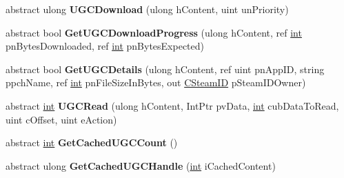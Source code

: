 \begin{DoxyCompactItemize}
\item 
\hypertarget{classValve_1_1Steamworks_1_1ISteamRemoteStorage_af43ba8d7eaeb954b49d538346be65f94}{}abstract ulong {\bfseries U\+G\+C\+Download} (ulong h\+Content, uint un\+Priority)\label{classValve_1_1Steamworks_1_1ISteamRemoteStorage_af43ba8d7eaeb954b49d538346be65f94}

\item 
\hypertarget{classValve_1_1Steamworks_1_1ISteamRemoteStorage_a98a4c419b5824559b90376d40bc0c92f}{}abstract bool {\bfseries Get\+U\+G\+C\+Download\+Progress} (ulong h\+Content, ref \hyperlink{SDL__thread_8h_a6a64f9be4433e4de6e2f2f548cf3c08e}{int} pn\+Bytes\+Downloaded, ref \hyperlink{SDL__thread_8h_a6a64f9be4433e4de6e2f2f548cf3c08e}{int} pn\+Bytes\+Expected)\label{classValve_1_1Steamworks_1_1ISteamRemoteStorage_a98a4c419b5824559b90376d40bc0c92f}

\item 
\hypertarget{classValve_1_1Steamworks_1_1ISteamRemoteStorage_a3c71218af10c95ec50a0c0fd14b9dc06}{}abstract bool {\bfseries Get\+U\+G\+C\+Details} (ulong h\+Content, ref uint pn\+App\+I\+D, string ppch\+Name, ref \hyperlink{SDL__thread_8h_a6a64f9be4433e4de6e2f2f548cf3c08e}{int} pn\+File\+Size\+In\+Bytes, out \hyperlink{structValve_1_1Steamworks_1_1CSteamID}{C\+Steam\+I\+D} p\+Steam\+I\+D\+Owner)\label{classValve_1_1Steamworks_1_1ISteamRemoteStorage_a3c71218af10c95ec50a0c0fd14b9dc06}

\item 
\hypertarget{classValve_1_1Steamworks_1_1ISteamRemoteStorage_acfa12f29f0c97dfbe78eeaeb420c6fdc}{}abstract \hyperlink{SDL__thread_8h_a6a64f9be4433e4de6e2f2f548cf3c08e}{int} {\bfseries U\+G\+C\+Read} (ulong h\+Content, Int\+Ptr pv\+Data, \hyperlink{SDL__thread_8h_a6a64f9be4433e4de6e2f2f548cf3c08e}{int} cub\+Data\+To\+Read, uint c\+Offset, uint e\+Action)\label{classValve_1_1Steamworks_1_1ISteamRemoteStorage_acfa12f29f0c97dfbe78eeaeb420c6fdc}

\item 
\hypertarget{classValve_1_1Steamworks_1_1ISteamRemoteStorage_a4561683d0198c84b8ca7ffb4d35b6799}{}abstract \hyperlink{SDL__thread_8h_a6a64f9be4433e4de6e2f2f548cf3c08e}{int} {\bfseries Get\+Cached\+U\+G\+C\+Count} ()\label{classValve_1_1Steamworks_1_1ISteamRemoteStorage_a4561683d0198c84b8ca7ffb4d35b6799}

\item 
\hypertarget{classValve_1_1Steamworks_1_1ISteamRemoteStorage_ade524c6d75e5ca67e9b12c6856a9e9d4}{}abstract ulong {\bfseries Get\+Cached\+U\+G\+C\+Handle} (\hyperlink{SDL__thread_8h_a6a64f9be4433e4de6e2f2f548cf3c08e}{int} i\+Cached\+Content)\label{classValve_1_1Steamworks_1_1ISteamRemoteStorage_ade524c6d75e5ca67e9b12c6856a9e9d4}


\end{DoxyCompactItemize}
